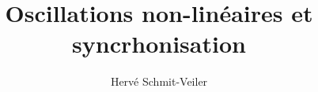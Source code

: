 



% 




    




    

    



% 

\documentclass{beamer}

\usepackage[utf8]{inputenc}
\usepackage{graphicx}
\usepackage{amsmath}
\usepackage{breqn} %

\usepackage[
            backend=biber,
            style=numeric,
            sorting=none,
            ]{biblatex}



\title{Oscillations non-linéaires et syncrhonisation}
\author{Hervé Schmit-Veiler}

\date{\parbox{\linewidth}{\centering%
13 Octobre, 2023%
\endgraf\bigskip
Stage effectué au LOMA \endgraf\medskip
Sous le supervision de\endgraf
Fabio Pistolesi \hspace*{0.5cm}et\hspace*{0.5cm} Rémi Avriller\endgraf
}}



